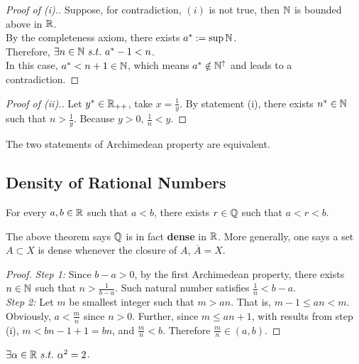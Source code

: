 \documentclass[11pt]{article}
\begin{document}
	\begin{proof}[Proof of (i).]
		Suppose, for contradiction, $(i)$ is not true, then $\mathbb{N}$ is bounded above in $\mathbb{R}$. \\
		By the completeness axiom, there exists $a^* := \sup \mathbb{N}$.\\
		Therefore, $\exists n \in \mathbb{N}\ s.t.\ a^* - 1< n$.\\
		In this case, $a^* < n + 1 \in \mathbb{N}$, which means $a^* \notin \mathbb{N}^\uparrow$ and leads to a contradiction.
	\end{proof}
	
	\begin{proof}[Proof of (ii).]
		Let $y^* \in \mathbb{R}_{++}$, take $x = \frac{1}{y}$. By statement (i), there exists $n^* \in \mathbb{N}$ such that $n >	\frac{1}{y}$. Because $y > 0$, $\frac{1}{n} < y$.
	\end{proof}
	
	\begin{remark}
		The two statements of Archimedean property are equivalent.
	\end{remark}
	
	\subsection{Density of Rational Numbers}
	\begin{theorem}
		For every $a, b \in \mathbb{R}$ such that $a < b$, there exists $r \in \mathbb{Q}$ such that $a < r < b$.
	\end{theorem}
	
	\begin{remark}
		The above theorem says $\mathbb{Q}$ is in fact \textbf{dense} in $\mathbb{R}$. More generally, one says a set $A \subset X$ is dense whenever the closure of $A$, $\overline{A} = X$.
	\end{remark}
	
	\begin{proof}
		\emph{Step 1:} Since $b - a > 0$, by the first Archimedean property, there exists $n \in \mathbb{N}$ such that $n > \frac{1}{b - a}$. Such natural number satisfies $\frac{1}{n} < b - a$.\\
		\emph{Step 2:} Let $m$ be smallest integer such that $m > an$. That is, $m - 1 \leq an < m$. Obviously, $a < \frac{m}{n}$ since $n > 0$. Further, since $m \leq an + 1$, with results from step (i), $m < bn - 1 + 1 = bn$, and $\frac{m}{n} < b$. Therefore $\frac{m}{n} \in (a, b)$.
	\end{proof}
	
	\begin{theorem}
		$\exists \alpha \in \mathbb{R}\ s.t.\ \alpha^2 = 2$.
	\end{theorem}
	
\end{document}
